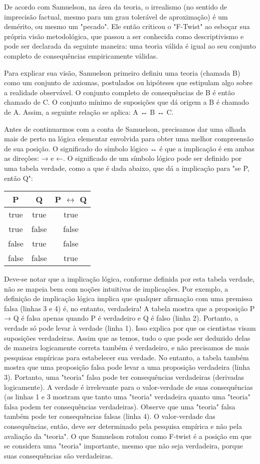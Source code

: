 \documentclass[12pt]{article}
\begin{document}
De acordo com Samuelson, na área da teoria, o irrealismo (no sentido de imprecisão factual, mesmo para um grau tolerável de aproximação) é um demérito, ou mesmo um "pecado". Ele então criticou o "F-Twist" ao esboçar sua própria visão metodológica, que passou a ser conhecida como descriptivismo e pode ser declarada da seguinte maneira: uma teoria válida é igual ao seu conjunto completo de consequências empiricamente válidas.

Para explicar sua visão, Samuelson primeiro definiu uma teoria (chamada B) como um conjunto de axiomas, postulados ou hipóteses que estipulam algo sobre a realidade observável. O conjunto completo de consequências de B é então chamado de C. O conjunto mínimo de suposições que dá origem a B é chamado de A. Assim, a seguinte relação se aplica: A ↔ B ↔ C.

Antes de continuarmos com a conta de Samuelson, precisamos dar uma olhada mais de perto na lógica elementar envolvida para obter uma melhor compreensão de sua posição. O significado do símbolo lógico ↔ é que a implicação é em ambas as direções: → e ←. O significado de um símbolo lógico pode ser definido por uma tabela verdade, como a que é dada abaixo, que dá a implicação para "se P, então Q":

\begin{center}
\begin{tabular}{|c|c|c|}
\hline
P & Q & P $\leftrightarrow$ Q \\
\hline
true & true & true \\
true & false & false \\
false & true & false \\
false & false & true \\
\hline
\end{tabular}
\end{center}

Deve-se notar que a implicação lógica, conforme definida por esta tabela verdade, não se mapeia bem com noções intuitivas de implicações. Por exemplo, a definição de implicação lógica implica que qualquer afirmação com uma premissa falsa (linhas 3 e 4) é, no entanto, verdadeira! A tabela mostra que a proposição P → Q é falsa apenas quando P é verdadeiro e Q é falso (linha 2). Portanto, a verdade só pode levar à verdade (linha 1). Isso explica por que os cientistas visam suposições verdadeiras. Assim que as temos, tudo o que pode ser deduzido delas de maneira logicamente correta também é verdadeiro, e não precisamos de mais pesquisas empíricas para estabelecer sua verdade. No entanto, a tabela também mostra que uma proposição falsa pode levar a uma proposição verdadeira (linha 3). Portanto, uma "teoria" falsa pode ter consequências verdadeiras (derivadas logicamente). A verdade é irrelevante para o valor-verdade de suas consequências (as linhas 1 e 3 mostram que tanto uma "teoria" verdadeira quanto uma "teoria" falsa podem ter consequências verdadeiras). Observe que uma "teoria" falsa também pode ter consequências falsas (linha 4). O valor-verdade das consequências, então, deve ser determinado pela pesquisa empírica e não pela avaliação da "teoria". O que Samuelson rotulou como F-twist é a posição em que se considera uma "teoria" importante, mesmo que não seja verdadeira, porque suas consequências são verdadeiras.
\end{document}
